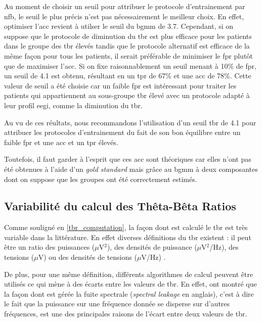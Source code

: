 Au moment de choisir un seuil pour attribuer le protocole d'entrainement par \gls{nfb}, le seuil le plus précis n'est pas nécessairement le meilleur choix.
En effet, optimiser l'\gls{acc} revient à utilser le seuil du \gls{bgmm} de 3.7. Cependant, si on suppose que le protocole de diminution du \gls{tbr} est plus 
efficace pour les patients dans le groupe des \gls{tbr} élevés tandis que le protocole alternatif est efficace de la même façon pour tous les patients, il 
serait préférable de minimiser le \gls{fpr} plutôt que de maximiser l'\gls{acc}. Si on fixe raisonnablement un seuil menant à 10\% de \gls{fpr}, un seuil de 4.1
est obtenu, résultant en un \gls{tpr} de 67\% et une \gls{acc} de 78\%. Cette valeur de seuil a été choisie car un faible \gls{fpr} est intéressant pour traiter 
les patients qui appartiennent au sous-groupe \gls{tbr} élevé avec un protocole adapté à leur profil \gls{eegi}, comme la diminution du \gls{tbr}.

Au vu de ces réultats, nous recommandons l'utilisation d'un seuil \gls{tbr} de 4.1 pour attribuer
les protocoles d'entrainement du fait de son bon équilibre entre un faible \gls{fpr} et une \gls{acc} et un \gls{tpr} élevés. 

Toutefois, il faut garder à l'esprit que ces \gls{acc} sont théoriques car elles n'ont pas été obtenues à l'aide d'un \textit{gold standard} mais grâce au \gls{bgmm}
à deux composantes dont on suppose que les groupes ont été correctement estimés. 

\subsection{Variabilité du calcul des Thêta-Bêta Ratios} 

Comme souligné en \ref{tbr_computation}, la façon dont est calculé le \gls{tbr} est très variable dans la littérature. En effet diverses définitions du \gls{tbr} existent :
il peut être un ratio des puissances ($\mu$V$^2$), des densités de puissance ($\mu$V$^2$/Hz), des tensions ($\mu$V) ou des densités de tensions ($\mu$V/Hz) 
\citep{Liechti2013}. 

De plus, pour une même définition, différents algorithmes de calcul peuvent être utilisés ce qui mène à des écarts entre les valeurs de \gls{tbr}. En 
effet, \citet{Kerson2019} ont montré que la façon dont est gérée la fuite spectrale (\textit{spectral leakage} en anglais), c'est à dire le fait que la puissance
sur une fréquence donnée se disperse sur d'autres fréquences, est une des principales raisons de l'écart entre deux valeurs de \gls{tbr}. 

